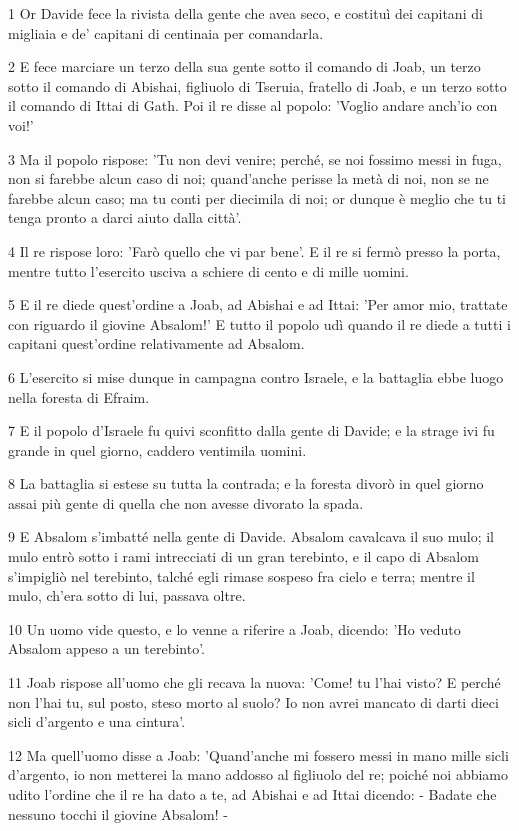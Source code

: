 \par 1 Or Davide fece la rivista della gente che avea seco, e costituì dei capitani di migliaia e de' capitani di centinaia per comandarla.
\par 2 E fece marciare un terzo della sua gente sotto il comando di Joab, un terzo sotto il comando di Abishai, figliuolo di Tseruia, fratello di Joab, e un terzo sotto il comando di Ittai di Gath. Poi il re disse al popolo: 'Voglio andare anch'io con voi!'
\par 3 Ma il popolo rispose: 'Tu non devi venire; perché, se noi fossimo messi in fuga, non si farebbe alcun caso di noi; quand'anche perisse la metà di noi, non se ne farebbe alcun caso; ma tu conti per diecimila di noi; or dunque è meglio che tu ti tenga pronto a darci aiuto dalla città'.
\par 4 Il re rispose loro: 'Farò quello che vi par bene'. E il re si fermò presso la porta, mentre tutto l'esercito usciva a schiere di cento e di mille uomini.
\par 5 E il re diede quest'ordine a Joab, ad Abishai e ad Ittai: 'Per amor mio, trattate con riguardo il giovine Absalom!' E tutto il popolo udì quando il re diede a tutti i capitani quest'ordine relativamente ad Absalom.
\par 6 L'esercito si mise dunque in campagna contro Israele, e la battaglia ebbe luogo nella foresta di Efraim.
\par 7 E il popolo d'Israele fu quivi sconfitto dalla gente di Davide; e la strage ivi fu grande in quel giorno, caddero ventimila uomini.
\par 8 La battaglia si estese su tutta la contrada; e la foresta divorò in quel giorno assai più gente di quella che non avesse divorato la spada.
\par 9 E Absalom s'imbatté nella gente di Davide. Absalom cavalcava il suo mulo; il mulo entrò sotto i rami intrecciati di un gran terebinto, e il capo di Absalom s'impigliò nel terebinto, talché egli rimase sospeso fra cielo e terra; mentre il mulo, ch'era sotto di lui, passava oltre.
\par 10 Un uomo vide questo, e lo venne a riferire a Joab, dicendo: 'Ho veduto Absalom appeso a un terebinto'.
\par 11 Joab rispose all'uomo che gli recava la nuova: 'Come! tu l'hai visto? E perché non l'hai tu, sul posto, steso morto al suolo? Io non avrei mancato di darti dieci sicli d'argento e una cintura'.
\par 12 Ma quell'uomo disse a Joab: 'Quand'anche mi fossero messi in mano mille sicli d'argento, io non metterei la mano addosso al figliuolo del re; poiché noi abbiamo udito l'ordine che il re ha dato a te, ad Abishai e ad Ittai dicendo: - Badate che nessuno tocchi il giovine Absalom! -
